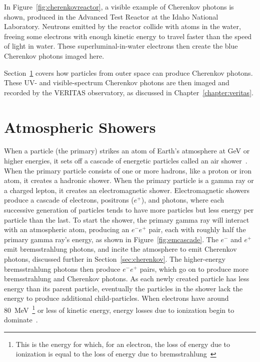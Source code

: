   In Figure~\ref{fig:cherenkovreactor}, a visible example of Cherenkov photons is shown, produced in the Advanced Test Reactor at the Idaho National Laboratory.
  Neutrons emitted by the reactor collide with atoms in the water, freeing some electrons with enough kinetic energy to travel faster than the speed of light in water.
  These superluminal-in-water electrons then create the blue Cherenkov photons imaged here.
  
  Section~\ref{sec:atmoshowers} covers how particles from outer space can produce Cherenkov photons.
  These UV- and visible-spectrum Cherenkov photons are then imaged and recorded by the VERITAS observatory, as discussed in Chapter~\ref{chapter:veritas}.
  
    
\section{Atmospheric Showers}\label{sec:atmoshowers}

  When a particle (the primary) strikes an atom of Earth's atmosphere at GeV or higher energies, it sets off a cascade of energetic particles called an air shower~\cite{Bethe1934,Klein1999}.
  When the primary particle consists of one or more hadrons, like a proton or iron atom, it creates a hadronic shower.
  When the primary particle is a gamma ray or a charged lepton, it creates an electromagnetic shower.
  Electromagnetic showers produce a cascade of electrons, positrons ($e^{+}$), and photons, where each successive generation of particles tends to have more particles but less energy per particle than the last.
  To start the shower, the primary gamma ray will interact with an atmospheric atom, producing an $e^{-}e^{+}$ pair, each with roughly half the primary gamma ray's energy, as shown in Figure~\ref{fig:emcascade}.
  The $e^{-}$ and $e^{+}$ emit bremsstrahlung photons, and incite the atmosphere to emit Cherenkov photons, discussed further in Section~\ref{sec:cherenkov}.
  The higher-energy bremsstrahlung photons then produce $e^{-}e^{+}$ pairs, which go on to produce more bremsstrahlung and Cherenkov photons.
  As each newly created particle has less energy than its parent particle, eventually the particles in the shower lack the energy to produce additional child-particles.
  When electrons have around \SI{80}{\MeV{}}\footnote{This is the energy for which, for an electron, the loss of energy due to ionization is equal to the loss of energy due to bremsstrahlung~\cite{tanabashi2018review,berger196410}} or less of kinetic energy, energy losses due to ionization begin to dominate~\cite{pdg_2014}.

